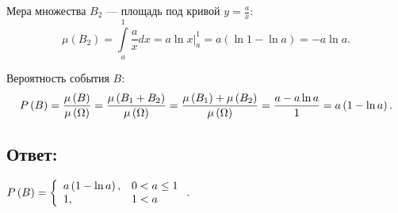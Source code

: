 \begin{enumerate}
    Мера множества $B_2$ --- площадь под кривой $y = \frac{a}{x}$:
    \begin{equation}
        \mu \left ( B_2 \right )
        = \int \limits_{a}^1 \frac{a}{x} dx
        = \left . a \ln x \right |_a^1
        = a \left ( \ln 1 - \ln a \right )
        = - a \ln a .
    \end{equation}

    Вероятность события $B$:
    \begin{equation}
        P \left ( B \right )
        = \frac{\mu \left ( B \right )}{\mu \left ( \Omega \right )}
        = \frac{\mu \left ( B_1 + B_2 \right )}{\mu \left ( \Omega \right )}
        = \frac{\mu \left ( B_1 \right ) + \mu \left ( B_2 \right )}{\mu \left ( \Omega \right )}
        = \frac{a - a \ln a}{1}
        = a \left ( 1 - \ln a \right ).
    \end{equation}
\end{enumerate}

\subsection*{Ответ:}
$
P \left ( B \right ) =
\left \{
\begin{array}{ll}
    a \left ( 1 - \ln a \right ), & 0 < a \le 1 \\
    1,         & 1 < a
\end{array}
\right .
.
$